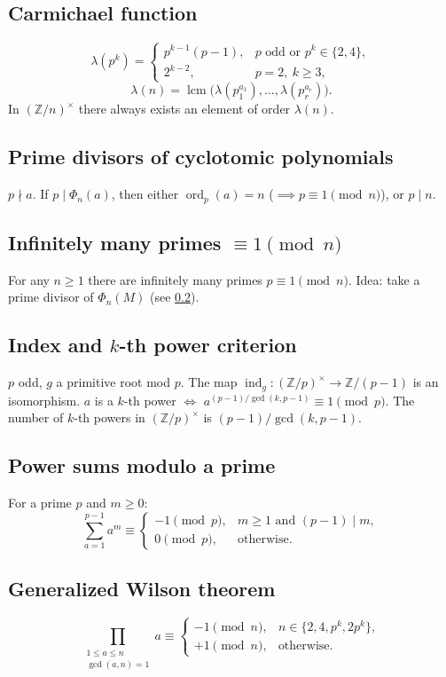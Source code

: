 \subsection{Carmichael function}
\label{subsec:carmichael}

$$\lambda(p^k)=\begin{cases}p^{k-1}(p-1), & p\text{ odd or }p^k\in\{2,4\},\\ 2^{k-2}, & p=2,\ k\ge3,\end{cases}$$
$$\lambda(n)=\operatorname{lcm}\bigl(\lambda(p_1^{a_1}),\dots,\lambda(p_r^{a_r})\bigr).$$
In $(\mathbb{Z}/n)^\times$ there always exists an element of order $\lambda(n)$.

\subsection{Prime divisors of cyclotomic polynomials}
\label{subsec:cyclotomic-prime}

$p\nmid a$. If $p\mid\Phi_n(a)$, then either $\operatorname{ord}_p(a)=n$ ($\implies p\equiv1\pmod n$), or $p\mid n$.

\subsection{Infinitely many primes $\equiv1\pmod n$}
\label{subsec:inf-primes-1modn}

For any $n\ge1$ there are infinitely many primes $p\equiv1\pmod n$. Idea: take a prime divisor of $\Phi_n(M)$ (see \ref{subsec:cyclotomic-prime}).

\subsection{Index and $k$-th power criterion}
\label{subsec:kth-power}

$p$ odd, $g$ a primitive root mod $p$. The map $\operatorname{ind}_g:(\mathbb{Z}/p)^\times\to\mathbb{Z}/(p-1)$ is an isomorphism.
$a$ is a $k$-th power $\iff$ $a^{(p-1)/\gcd(k,p-1)}\equiv1\pmod p$.
The number of $k$-th powers in $(\mathbb{Z}/p)^\times$ is $(p-1)/\gcd(k,p-1)$.

\subsection{Power sums modulo a prime}
\label{subsec:power-sums-mod}

For a prime $p$ and $m\ge0$:
$$\sum_{a=1}^{p-1}a^m\equiv\begin{cases}
-1\pmod p, & m\ge1\text{ and }(p-1)\mid m,\\
0\pmod p, & \text{otherwise}.
\end{cases}$$

\subsection{Generalized Wilson theorem}
\label{subsec:generalized-wilson}

$$\prod_{\substack{1\le a\le n\\\gcd(a,n)=1}}a\equiv\begin{cases}
-1\pmod n, & n\in\{2,4,p^k,2p^k\},\\
+1\pmod n, & \text{otherwise}.
\end{cases}$$
